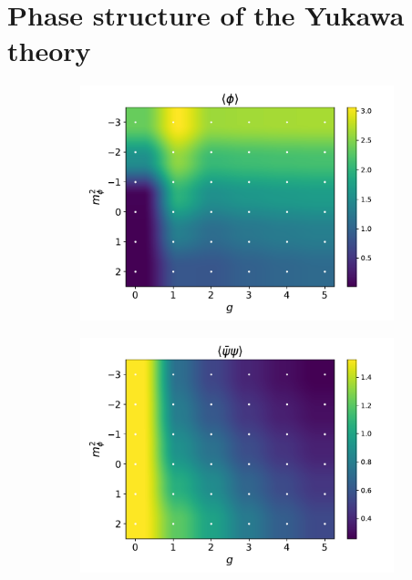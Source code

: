 \newpage

\section{Phase structure of the Yukawa theory}
\begin{figure}[]
    \centering
    \begin{subfigure}[b]{0.47\textwidth}
        \includegraphics[width=\textwidth]{figures/phase_diagram/g-m/phase_diagram_phi.pdf}
    \end{subfigure}
    \begin{subfigure}[b]{0.47\textwidth}
        \includegraphics[width=\textwidth]{figures/phase_diagram/g-m/phase_diagram_cond.pdf}

\end{subfigure}
\end{figure}
